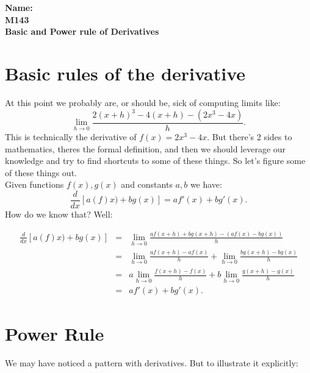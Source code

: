 \documentclass[10pt]{article}
\theoremstyle{definition}
\newcommand{\limit}[2]{\displaystyle{ \lim_{#1 \to #2}}}
\begin{document}
%

{\bf Name:} \hrulefill\hrulefill\hrulefill\\
{\bf M143} \qquad \qquad \\
{\bf Basic and Power rule of Derivatives}\\ %

\section{Basic rules of the derivative}

At this point we probably are, or should be, sick of computing limits like: $$\limit{h}{0}\frac{2(x+h)^3-4(x+h)-(2x^3-4x)}{h}.$$  This is technically the derivative of $f(x)=2x^3-4x$.  But there's 2 sides to mathematics, theres the formal definition, and then we should leverage our knowledge and try to find shortcuts to some of these things.  So let's  figure some of these things out.\\

Given functions $f(x), g(x)$ and constants $a,b$ we have: $$\frac{d}{dx}[a(f)x)+bg(x)]=af'(x)+bg'(x).$$  How do we know that?  Well:

\begin{eqnarray*}
\frac{d}{dx}[a(f)x)+bg(x)]&=&\limit{h}{0}\frac{af(x+h)+bg(x+h)-(af(x)-bg(x))}{h}\\
&=&\limit{h}{0}\frac{af(x+h)-af(x)}{h}+\limit{h}{0}\frac{bg(x+h)-bg(x)}{h}\\
&=&a\limit{h}{0}\frac{f(x+h)-f(x)}{h}+b\limit{h}{0}\frac{g(x+h)-g(x)}{h}\\
&=&af'(x)+bg'(x).
\end{eqnarray*}

\section{Power Rule}

We may have noticed a pattern with derivatives.  But to illustrate it explicitly:
\end{document}
